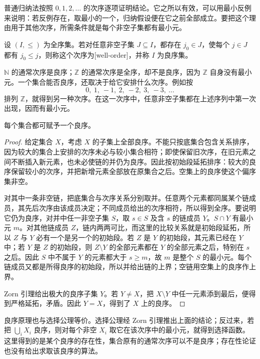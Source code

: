 普通归纳法按照 \(0,1,2,\ldots\) 的次序逐项证明结论。它之所以有效，可以用最小反例来说明：若反例存在，取最小的一个，归纳假设便在它之前全部成立。要把这个理由用于其他次序，所需条件就是每个非空子集都有最小元。

\begin{definition}\label{b1:def:A-well-order}
	设 \((I,\leq)\) 为全序集。若对任意非空子集 \(J\subseteq I\)，都存在 \(j_0\in J\)，使每个 \(j\in J\) 都有 \(j_0\leq j\)，则称这个次序为[well-order]，并称 \(I\) 为良序集。
\end{definition}

\(\mathbb N\) 的通常次序是良序；\(\mathbb Z\) 的通常次序是全序，却不是良序，因为 \(\mathbb Z\) 自身没有最小元。一个集合能否良序，还取决于给它安排什么次序。例如按
\[
	0,\ 1,\ -1,\ 2,\ -2,\ 3,\ -3,\ \ldots
\]
排列 \(\mathbb Z\)，就得到另一种次序。在这一次序中，任意非空子集都在上述序列中第一次出现，因而有最小元。

\begin{claim}[良序原理]\label{b1:claim:A-well-order}
	每个集合都可赋予一个良序。
\end{claim}

\begin{proof}
	给定集合 \(X\)，考虑 \(X\) 的子集上全部良序。不能只按底集合包含关系排序，因为较大的集合上安排的次序未必与较小集合相符；即使保留旧次序，在旧元素之间不断插入新元素，也未必使链的并仍为良序。因此按初始段延拓排序：较大的良序保留较小的次序，并把新增元素全部放在原集合之后。空集上的良序使这个偏序集非空。

	对其中一条非空链，把底集合与次序关系分别取并。任意两个元素都同属某个链成员，其先后次序由该成员决定；不同成员给出的次序相符，所以得到全序。要说明它仍为良序，对并中任一非空子集 \(S\)，取 \(s\in S\) 及含 \(s\) 的链成员 \(Y\)。\(S\cap Y\) 有最小元 \(m\)。对其他链成员 \(Z\)，链内两两可比，而这里的比较关系就是初始段延拓，所以 \(Z\) 与 \(Y\) 必有一个是另一个的初始段。若 \(Z\) 是 \(Y\) 的初始段，其元素已经在 \(Y\) 中；若 \(Y\) 是 \(Z\) 的初始段，则 \(Z\setminus Y\) 的全部元素都在 \(Y\) 的全部元素之后，特别在 \(s\) 之后。因此 \(S\) 中不属于 \(Y\) 的元素都大于 \(s\geq m\)，故 \(m\) 是整个 \(S\) 的最小元。每个链成员又都是所得良序的初始段，所以并给出链的上界；空链用空集上的良序作上界。

	Zorn 引理给出极大的良序子集 \(Y\)。若 \(Y\ne X\)，把 \(X\setminus Y\) 中任一元素添到最后，便得到严格延拓，矛盾。因此 \(Y=X\)，得到了 \(X\) 上的良序。
\end{proof}

良序原理也与选择公理等价。选择公理经 Zorn 引理推出上面的结论；反过来，若把 \(\bigcup_iX_i\) 良序，则对每个非空 \(X_i\) 取它在该次序中的最小元，就得到选择函数。这里得到的是某个良序的存在性，集合原有的通常次序可以不是良序；存在性论证也没有给出求取该良序的算法。

